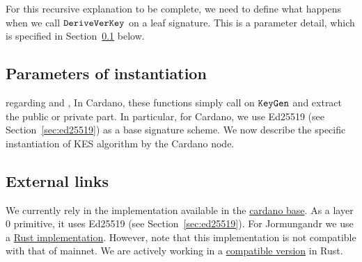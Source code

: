 For this recursive explanation to be complete, we need to define what happens when we call $\texttt{DeriveVerKey}$ on a leaf
signature. This is a parameter detail, which is specified in Section~\ref{sec:kes:params} below.

\subsection{Parameters of instantiation}
\label{sec:kes:params}
regarding \pkeygen and \skeygen, In Cardano,
these functions simply call on $\texttt{KeyGen}$ and extract the public or private part.
In particular, for Cardano, we use Ed25519 (see
Section~\ref{sec:ed25519}) as a base signature scheme.
We now describe the specific instantiation of KES algorithm by the Cardano node.
\subsection{External links}
We currently rely in the implementation available in the \href{https://github
.com/input-output-hk/cardano-base/tree/master/cardano-crypto-class/src/Cardano/Crypto/KES}{cardano base}. As a layer
0 primitive, it uses Ed25519 (see Section~\ref{sec:ed25519}). For Jormungandr we use a \href{https://github
.com/input-output-hk/chain-libs/tree/master/chain-crypto/src/algorithms/sumed25519}{Rust implementation}. However,
note that this implementation is not compatible with that of mainnet. We are actively working in a
\href{https://github.com/input-output-hk/kes-mmm-sumed25519/tree/crate_review}{compatible version} in Rust.

